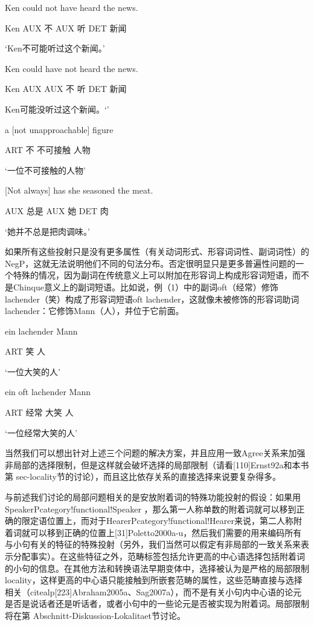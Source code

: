 Ken could not have heard the news.

Ken AUX 不 AUX 听 DET 新闻

`Ken不可能听过这个新闻。'

Ken could have not heard the news.

Ken AUX AUX 不 听 DET 新闻

Ken可能没听过这个新闻。`'

a [not unapproachable] figure

ART 不 不可接触 人物

`一位不可接触的人物'

[Not always] has she seasoned the meat.

AUX 总是 AUX 她 DET 肉

`她并不总是把肉调味。'

如果所有这些投射只是没有更多属性（有关动词形式、形容词词性、副词词性）的NegP，这就无法说明他们不同的句法分布。否定很明显只是更多普遍性问题的一个特殊的情况，因为副词在传统意义上可以附加在形容词上构成形容词短语，而不是Chinque意义上的副词短语。比如说，例（1）中的副词oft（经常）修饰lachender（笑）构成了形容词短语oft lachender，这就像未被修饰的形容词助词lachender：它修饰Mann（人），并位于它前面。









ein lachender Mann

     ART 笑 人

`一位大笑的人'



ein oft lachender Mann

     ART 经常 大笑 人

`一位经常大笑的人'



当然我们可以想出针对上述三个问题的解决方案，并且应用一致Agree关系来加强非局部的选择限制，但是这样就会破坏选择的局部限制（请看[110]Ernst92a和本书第 sec-locality节的讨论），而且这比依存关系的直接选择来说要复杂得多。





与前述我们讨论的局部问题相关的是安放附着词的特殊功能投射的假设：如果用SpeakerPcategory!functional!Speaker ，那么第一人称单数的附着词就可以移到正确的限定语位置上，而对于HearerPcategory!functional!Hearer来说，第二人称附着词就可以移到正确的位置上[31]Poletto2000a-u，然后我们需要的用来编码所有与小句有关的特征的特殊投射（另外，我们当然可以假定有非局部的一致关系来表示分配事实）。在这些特征之外，范畴标签包括允许更高的中心语选择包括附着词的小句的信息。在其他方法和转换语法早期变体中，选择被认为是严格的局部限制locality，这样更高的中心语只能接触到所嵌套范畴的属性，这些范畴直接与选择相关（citealp[223]Abraham2005a、Sag2007a），而不是有关小句内中心语的论元是否是说话者还是听话者，或者小句中的一些论元是否被实现为附着词。局部限制将在第 Abschnitt-Diskussion-Lokalitaet节讨论。
















